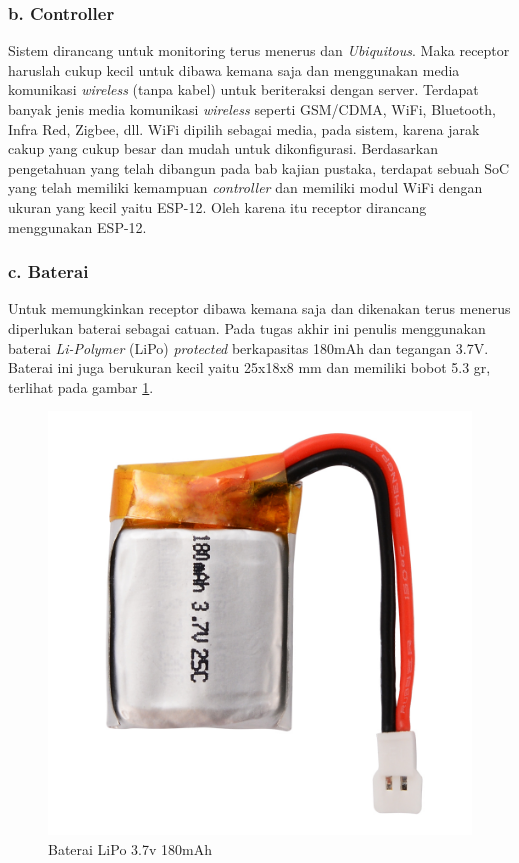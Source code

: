 \subsubsection{b. Controller}
Sistem dirancang untuk monitoring terus menerus dan \textit{Ubiquitous}. Maka receptor haruslah cukup kecil untuk dibawa kemana saja dan menggunakan media komunikasi \textit{wireless} (tanpa kabel) untuk beriteraksi dengan server. Terdapat banyak jenis media komunikasi \textit{wireless} seperti GSM/CDMA, WiFi, Bluetooth, Infra Red, Zigbee, dll. WiFi dipilih sebagai media, pada sistem, karena jarak cakup yang cukup besar dan mudah untuk dikonfigurasi. Berdasarkan pengetahuan yang telah dibangun pada bab kajian pustaka, terdapat sebuah SoC yang telah memiliki kemampuan \textit{controller} dan memiliki modul WiFi dengan ukuran yang kecil yaitu ESP-12. Oleh karena itu receptor dirancang menggunakan ESP-12.

\subsubsection{c. Baterai}
Untuk memungkinkan receptor dibawa kemana saja dan dikenakan terus menerus diperlukan baterai sebagai catuan. Pada tugas akhir ini penulis menggunakan baterai \textit{Li-Polymer} (LiPo) \textit{protected} berkapasitas 180mAh dan tegangan 3.7V. Baterai ini juga berukuran kecil yaitu 25x18x8 mm dan memiliki bobot 5.3 gr, terlihat pada gambar \ref{fig:battery}.

\begin{figure}[H]
	\centering
	\includegraphics[scale=0.14]{images/baterai.jpg}
	\caption{Baterai LiPo 3.7v 180mAh}
	\label{fig:battery}
\end{figure}

